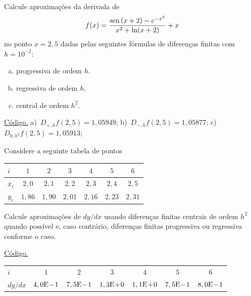\begin{exer}\label{exer:df_fun}
  Calcule aproximações da derivada de
  \begin{equation}
    f(x) = \frac{\operatorname{sen}\,(x+2) - e^{-x^2}}{x^2 + \ln(x+2)}+x
  \end{equation}
no ponto $x=2,5$ dadas pelas seguintes fórmulas de diferenças finitas com $h=10^{-2}$:
\begin{enumerate}[a)]
\item progressiva de ordem $h$.
\item regressiva de ordem $h$.
\item central de ordem $h^2$.
\end{enumerate}
\end{exer}
\begin{resp}
  \ifisoctave 
  \href{https://github.com/phkonzen/notas/blob/master/src/MatematicaNumerica/cap_deriv/dados/exer_df_fun/exer_df_fun.m}{Código.} 
  \fi
  a)~$D_{+,h}f(2,5)=1,05949$; b)~$D_{-,h}f(2,5)=1,05877$; c)~$D_{0,h^2}f(2,5)=1,05913$;
\end{resp}

\begin{exer}\label{exer:df_tab}
  Considere a seguinte tabela de pontos
  \begin{center}
    \begin{tabular}{l|cccccc}
      $i$ & $1$ & $2$ & $3$ & $4$ & $5$ & $6$ \\\hline
      $x_i$ & $2,0$ & $2,1$ & $2,2$ & $2,3$ & $2,4$ & $2,5$ \\
      $y_i$ & $1,86$ & $1,90$ & $2,01$ & $2,16$ & $2,23$ & $2,31$ \\\hline
    \end{tabular}
  \end{center}
Calcule aproximações de $dy/dx$ usando diferenças finitas centrais de ordem $h^2$ quando possível e, caso contrário, diferenças finitas progressiva ou regressiva conforme o caso.
\end{exer}
\begin{resp}
  \ifisoctave 
  \href{https://github.com/phkonzen/notas/blob/master/src/MatematicaNumerica/cap_deriv/dados/exer_df_tab/exer_df_tab.m}{Código.} 
  \fi
  \begin{center}
    \begin{tabular}{l|cccccc}\hline
      $i$ & $1$ & $2$ & $3$ & $4$ & $5$ & $6$ \\
      $dy/dx$ & $4,0\mathrm{E}\!-\!1$ & $7,5\mathrm{E}\!-\!1$ & $1,3\mathrm{E}\!+\!0$ & $1,1\mathrm{E}\!+\!0$ & $7,5\mathrm{E}\!-\!1$ & $8,0\mathrm{E}\!-\!1$ \\\hline
    \end{tabular}
  \end{center}
\end{resp}

